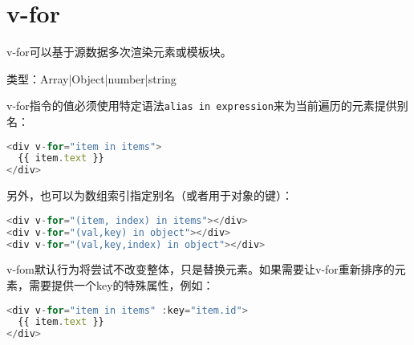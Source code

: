 \begin{lstlisting}[language=JavaScript]

\end{lstlisting}




\begin{lstlisting}[language=JavaScript]

\end{lstlisting}




\begin{lstlisting}[language=JavaScript]

\end{lstlisting}

\chapter{v-for}

v-for可以基于源数据多次渲染元素或模板块。

\begin{compactitem}
\item 类型：Array|Object|number|string
\end{compactitem}

v-for指令的值必须使用特定语法\texttt{alias in expression}来为当前遍历的元素提供别名：


\begin{lstlisting}[language=JavaScript]
<div v-for="item in items">
  {{ item.text }}
</div>
\end{lstlisting}

另外，也可以为数组索引指定别名（或者用于对象的键）：



\begin{lstlisting}[language=JavaScript]
<div v-for="(item, index) in items"></div>
<div v-for="(val,key) in object"></div>
<div v-for="(val,key,index) in object"></div>
\end{lstlisting}

v-fom默认行为将尝试不改变整体，只是替换元素。如果需要让v-for重新排序的元素，需要提供一个key的特殊属性，例如：


\begin{lstlisting}[language=JavaScript]
<div v-for="item in items" :key="item.id">
  {{ item.text }}
</div>
\end{lstlisting}




\begin{lstlisting}[language=JavaScript]

\end{lstlisting}




